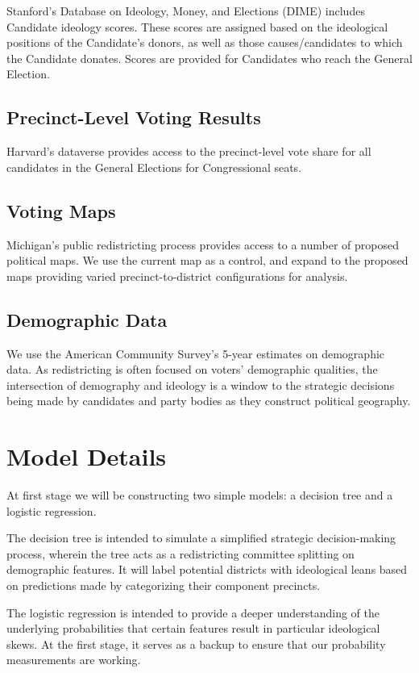 Stanford's Database on Ideology, Money, and Elections (DIME) includes
Candidate ideology scores. These scores are assigned based on
the ideological positions of the Candidate's donors, as well as those
causes/candidates to which the Candidate donates. Scores are provided
for Candidates who reach the General Election.


\subsection{Precinct-Level Voting Results}


Harvard's dataverse provides access to the precinct-level vote share for 
all candidates in the General Elections for Congressional seats. 


\subsection{Voting Maps}


Michigan's public redistricting process provides access to a number of
proposed political maps. We use the current map as a control, and expand
to the proposed maps providing varied precinct-to-district
configurations for analysis.


\subsection{Demographic Data}


We use the American Community Survey's 5-year estimates on demographic data.
As redistricting is often focused on voters' demographic qualities, the 
intersection of demography and ideology is a window to the strategic decisions
being made by candidates and party bodies as they construct political geography.


\section{Model Details}


At first stage we will be constructing two simple models: a decision tree
and a logistic regression. 

The decision tree is intended to simulate a simplified strategic 
decision-making process, wherein the tree acts as a redistricting 
committee splitting on demographic features. It will label potential
districts with ideological leans based on predictions made by
categorizing their component precincts.

The logistic regression is intended to provide a deeper understanding
of the underlying probabilities that certain features result in 
particular ideological skews. At the first stage, it serves as a
backup to ensure that our probability measurements are working.


